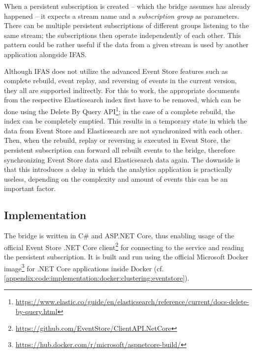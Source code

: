 When a persistent subscription is created -- which the bridge assumes has already happened -- it expects a stream name and a \emph{subscription group} as parameters.
There can be multiple persistent subscriptions of different groups listening to the same stream; the subscriptions then operate independently of each other.
This pattern could be rather useful if the data from a given stream is used by another application alongside \ac{IFAS}.


Although \ac{IFAS} does not utilize the advanced Event Store features such as complete rebuild, event replay, and reversing of events in the current version, they all are supported indirectly.
For this to work, the appropriate documents from the respective Elasticsearch index first have to be removed, which can be done using the Delete By Query API\footnote{\url{https://www.elastic.co/guide/en/elasticsearch/reference/current/docs-delete-by-query.html}}; in the case of a complete rebuild, the index can be completely emptied.
This results in a temporary state in which the data from Event Store and Elasticsearch are not synchronized with each other.
Then, when the rebuild, replay or reversing is executed in Event Store, the persistent subscription can forward all rebuilt events to the bridge, therefore synchronizing Event Store data and Elasticsearch data again.
The downside is that this introduces a delay in which the analytics application is practically useless, depending on the complexity and amount of events this can be an important factor.

\subsection{Implementation}

The bridge is written in C\# and ASP.NET Core, thus enabling usage of the official Event Store .NET Core client\footnote{\url{https://github.com/EventStore/ClientAPI.NetCore}} for connecting to the service and reading the persistent subscription.
It is built and run using the official Microsoft Docker image\footnote{\url{https://hub.docker.com/r/microsoft/aspnetcore-build/}} for .NET Core applications inside Docker (cf. \cref{appendix:code:implementation:docker:clustering:eventstore}).

